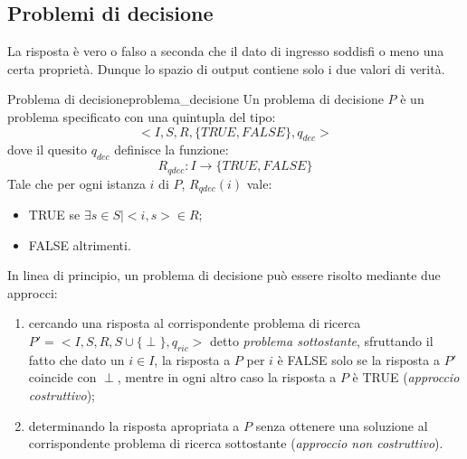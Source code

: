 \documentclass[12pt]{report}
\newcounter{definition}
\newcommand{\nmu}{}
\begin{document}
   	\subsection{Problemi di decisione}
   	La risposta è vero o falso a seconda che il dato di ingresso soddisfi o meno una certa proprietà. Dunque lo spazio di output contiene solo i due valori di verità.
   	\begin{definition}{\nmu Problema di decisione}{problema_decisione}
   		Un problema di decisione $P$ è un problema specificato con una quintupla del tipo:
   		\[
   		<I, S, R, \{TRUE, FALSE\}, q_{dec}>
   		\]
   		dove il quesito $q_{dec}$ definisce la funzione:
   		\[
   		R_{qdec}: I \to \{TRUE, FALSE\}
   		\]
   		Tale che per ogni istanza $i$ di $P$, $R_{qdec}(i)$ vale:
   		\begin{itemize}
   			\item TRUE se $\exists s \in S \mid <i, s> \in R$;
   			\item FALSE altrimenti.
   		\end{itemize}
   	\end{definition}
   	In linea di principio, un problema di decisione può essere risolto mediante due approcci:
   	\begin{enumerate}
   		\item cercando una risposta al corrispondente problema di ricerca $P'=<I, S, R, S \cup \{\perp\}, q_{ric}>$ detto \textit{problema sottostante}, sfruttando il fatto che dato un $i \in I$, la risposta a $P$ per $i$ è FALSE solo se la risposta a $P'$ coincide con $\perp$, mentre in ogni altro caso la risposta a $P$ è TRUE (\textit{approccio costruttivo});
   		\item determinando la risposta apropriata a $P$ senza ottenere una soluzione al corrispondente problema di ricerca sottostante (\textit{approccio non costruttivo}).
   	\end{enumerate}
\end{document}
